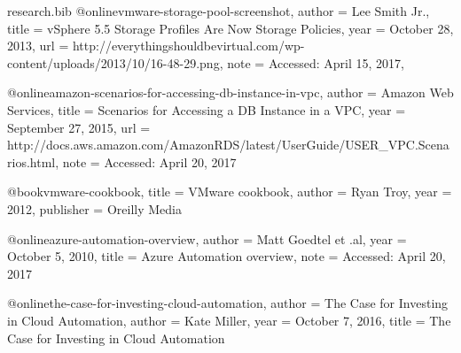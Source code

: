 \documentclass{article}
\begin{document}
\begin{filecontents*}{research.bib}
	@online{vmware-storage-pool-screenshot,
		author  = {Lee Smith Jr.},
		title   = {vSphere 5.5 Storage Profiles Are Now Storage Policies},
		year    = {October 28, 2013},
		url     = {http://everythingshouldbevirtual.com/wp-content/uploads/2013/10/16-48-29.png},
		note = {Accessed: April 15, 2017},
	}

	@online{amazon-scenarios-for-accessing-db-instance-in-vpc,
		author = {Amazon Web Services},
		title = {Scenarios for Accessing a DB Instance in a VPC},
		year = {September 27, 2015},
		url = {http://docs.aws.amazon.com/AmazonRDS/latest/UserGuide/USER_VPC.Scenarios.html},
		note = {Accessed: April 20, 2017}
	}

	@book{vmware-cookbook,
		title = {VMware cookbook},
		author = {Ryan Troy},
		year = {2012},
		publisher = {Oreilly Media}
	}

	@online{azure-automation-overview,
		author = {Matt Goedtel et .al},
		year = {October 5, 2010},
		title = {Azure Automation overview},
		note = {Accessed: April 20, 2017}
	}

	@online{the-case-for-investing-cloud-automation,
		author = {The Case for Investing in Cloud Automation},
		author = {Kate Miller},
		year = {October 7, 2016},
		title = {The Case for Investing in Cloud Automation}
	}

\end{filecontents*}


\end{document}
